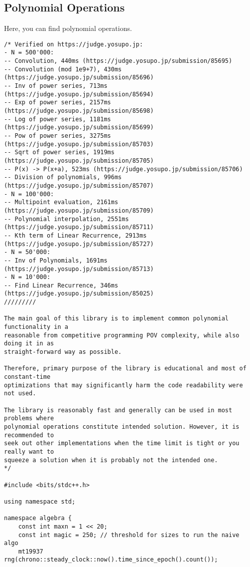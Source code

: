 \subsection{Polynomial Operations}
Here, you can find polynomial operations.
\begin{lstlisting}
/* Verified on https://judge.yosupo.jp:
- N = 500'000:
-- Convolution, 440ms (https://judge.yosupo.jp/submission/85695)
-- Convolution (mod 1e9+7), 430ms (https://judge.yosupo.jp/submission/85696)
-- Inv of power series, 713ms (https://judge.yosupo.jp/submission/85694)
-- Exp of power series, 2157ms (https://judge.yosupo.jp/submission/85698)
-- Log of power series, 1181ms (https://judge.yosupo.jp/submission/85699)
-- Pow of power series, 3275ms (https://judge.yosupo.jp/submission/85703)
-- Sqrt of power series, 1919ms (https://judge.yosupo.jp/submission/85705)
-- P(x) -> P(x+a), 523ms (https://judge.yosupo.jp/submission/85706)
-- Division of polynomials, 996ms (https://judge.yosupo.jp/submission/85707)
- N = 100'000:
-- Multipoint evaluation, 2161ms (https://judge.yosupo.jp/submission/85709)
-- Polynomial interpolation, 2551ms (https://judge.yosupo.jp/submission/85711)
-- Kth term of Linear Recurrence, 2913ms (https://judge.yosupo.jp/submission/85727)
- N = 50'000:
-- Inv of Polynomials, 1691ms (https://judge.yosupo.jp/submission/85713)
- N = 10'000:
-- Find Linear Recurrence, 346ms (https://judge.yosupo.jp/submission/85025)
/////////

The main goal of this library is to implement common polynomial functionality in a
reasonable from competitive programming POV complexity, while also doing it in as
straight-forward way as possible.

Therefore, primary purpose of the library is educational and most of constant-time
optimizations that may significantly harm the code readability were not used.

The library is reasonably fast and generally can be used in most problems where
polynomial operations constitute intended solution. However, it is recommended to
seek out other implementations when the time limit is tight or you really want to
squeeze a solution when it is probably not the intended one.
*/

#include <bits/stdc++.h>

using namespace std;

namespace algebra {
    const int maxn = 1 << 20;
    const int magic = 250; // threshold for sizes to run the naive algo
    mt19937 rng(chrono::steady_clock::now().time_since_epoch().count()); 


\end{lstlisting}
